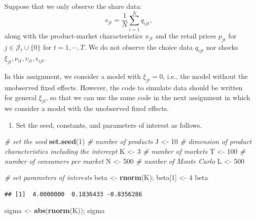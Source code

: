 \documentclass[]{book}
\newenvironment{Shaded}{\begin{snugshade}}{\end{snugshade}}
\newcommand{\KeywordTok}[1]{\textcolor[rgb]{0.13,0.29,0.53}{\textbf{#1}}}
\newcommand{\DecValTok}[1]{\textcolor[rgb]{0.00,0.00,0.81}{#1}}
\newcommand{\StringTok}[1]{\textcolor[rgb]{0.31,0.60,0.02}{#1}}
\newcommand{\CommentTok}[1]{\textcolor[rgb]{0.56,0.35,0.01}{\textit{#1}}}
\newcommand{\NormalTok}[1]{#1}
\providecommand{\tightlist}{%
  \setlength{\itemsep}{0pt}\setlength{\parskip}{0pt}}
\begin{document}
Suppose that we only observe the share data: \[
s_{jt} = \frac{1}{N} \sum_{i = 1}^N q_{ijt},
\] along with the product-market characteristics \(x_{jt}\) and the
retail prices \(p_{jt}\) for \(j \in \mathcal{J}_t \cup \{0\}\) for
\(t = 1, \cdots, T\). We do not observe the choice data \(q_{ijt}\) nor
shocks \(\xi_{jt}, \nu_{it}, \upsilon_{it}, \epsilon_{ijt}\).

In this assignment, we consider a model with \(\xi_{jt} = 0\), i.e., the
model without the unobserved fixed effects. However, the code to
simulate data should be written for general \(\xi_{jt}\), so that we can
use the same code in the next assignment in which we consider a model
with the unobserved fixed effects.

\begin{enumerate}
\def\labelenumi{\arabic{enumi}.}
\tightlist
\item
  Set the seed, constants, and parameters of interest as follows.
\end{enumerate}

\begin{Shaded}
\begin{Highlighting}[]
\CommentTok{# set the seed}
\KeywordTok{set.seed}\NormalTok{(}\DecValTok{1}\NormalTok{)}
\CommentTok{# number of products}
\NormalTok{J <-}\StringTok{ }\DecValTok{10}
\CommentTok{# dimension of product characteristics including the intercept}
\NormalTok{K <-}\StringTok{ }\DecValTok{3}
\CommentTok{# number of markets}
\NormalTok{T <-}\StringTok{ }\DecValTok{100}
\CommentTok{# number of consumers per market}
\NormalTok{N <-}\StringTok{ }\DecValTok{500}
\CommentTok{# number of Monte Carlo}
\NormalTok{L <-}\StringTok{ }\DecValTok{500}
\end{Highlighting}
\end{Shaded}

\begin{Shaded}
\begin{Highlighting}[]
\CommentTok{# set parameters of interests}
\NormalTok{beta <-}\StringTok{ }\KeywordTok{rnorm}\NormalTok{(K); }
\NormalTok{beta[}\DecValTok{1}\NormalTok{] <-}\StringTok{ }\DecValTok{4}
\NormalTok{beta}
\end{Highlighting}
\end{Shaded}

\begin{verbatim}
## [1]  4.0000000  0.1836433 -0.8356286
\end{verbatim}

\begin{Shaded}
\begin{Highlighting}[]
\NormalTok{sigma <-}\StringTok{ }\KeywordTok{abs}\NormalTok{(}\KeywordTok{rnorm}\NormalTok{(K)); sigma}
\end{Highlighting}
\end{Shaded}
\end{document}
